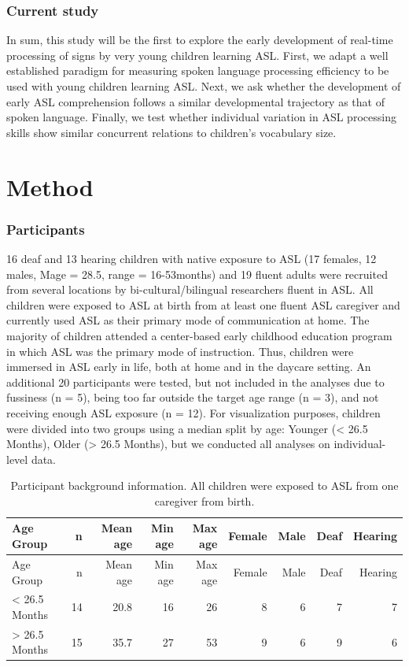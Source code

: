 \documentclass[12pt,]{article}
\begin{document}
\subsubsection{Current study}\label{current-study}

In sum, this study will be the first to explore the early development of
real-time processing of signs by very young children learning ASL.
First, we adapt a well established paradigm for measuring spoken
language processing efficiency to be used with young children learning
ASL. Next, we ask whether the development of early ASL comprehension
follows a similar developmental trajectory as that of spoken language.
Finally, we test whether individual variation in ASL processing skills
show similar concurrent relations to children's vocabulary size.

\section{Method}\label{method}

\subsubsection{Participants}\label{participants}

16 deaf and 13 hearing children with native exposure to ASL (17 females,
12 males, Mage = 28.5, range = 16-53months) and 19 fluent adults were
recruited from several locations by bi-cultural/bilingual researchers
fluent in ASL. All children were exposed to ASL at birth from at least
one fluent ASL caregiver and currently used ASL as their primary mode of
communication at home. The majority of children attended a center-based
early childhood education program in which ASL was the primary mode of
instruction. Thus, children were immersed in ASL early in life, both at
home and in the daycare setting. An additional 20 participants were
tested, but not included in the analyses due to fussiness (n = 5), being
too far outside the target age range (n = 3), and not receiving enough
ASL exposure (n = 12). For visualization purposes, children were divided
into two groups using a median split by age: Younger (\textless{} 26.5
Months), Older (\textgreater{} 26.5 Months), but we conducted all
analyses on individual-level data.

\begin{longtable}[c]{@{}lrrrrrrrr@{}}
\caption{Participant background information. All children were exposed
to ASL from one caregiver from birth.}\tabularnewline
\toprule
Age Group & n & Mean age & Min age & Max age & Female & Male & Deaf &
Hearing\tabularnewline
\midrule
\endfirsthead
\toprule
Age Group & n & Mean age & Min age & Max age & Female & Male & Deaf &
Hearing\tabularnewline
\midrule
\endhead
\textless{} 26.5 Months & 14 & 20.8 & 16 & 26 & 8 & 6 & 7 &
7\tabularnewline
\textgreater{} 26.5 Months & 15 & 35.7 & 27 & 53 & 9 & 6 & 9 &
6\tabularnewline
\bottomrule
\end{longtable}
\end{document}
